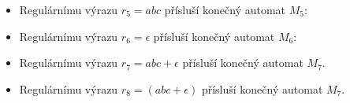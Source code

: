 \documentclass[a4paper,11pt]{article}[24.3.2010]
\begin{document}
\begin{enumerate}
\begin{enumerate}
\begin{itemize}
        \item Regulárnímu výrazu $r_{5}=abc$ přísluší konečný automat $M_{5}$:
        \begin{figure}[h!]
        \begin{center}
        \end{center}
        \end{figure}
        \item Regulárnímu výrazu $r_{6}=\epsilon$ přísluší konečný automat $M_{6}$: 
        \begin{figure}[h!]
        \begin{center}
        \end{center}
        \end{figure}
        \item Regulárnímu výrazu $r_{7}=abc+\epsilon$ přísluší konečný automat $M_{7}$.
        \begin{figure}[h!]
        \begin{center}
        \end{center}
        \end{figure}
        \item Regulárnímu výrazu $r_{8}=(abc+\epsilon)$ přísluší konečný automat $M_{7}$.
        \newpage


\end{itemize}
\end{enumerate}
\end{enumerate}
\end{document}
